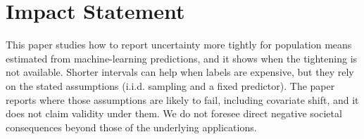 \documentclass{article}
\theoremstyle{plain}
\theoremstyle{remark}
\begin{document}












\section*{Impact Statement}
This paper studies how to report uncertainty more tightly for population means estimated from machine-learning predictions, and it shows when the tightening is not available. Shorter intervals can help when labels are expensive, but they rely on the stated assumptions (i.i.d. sampling and a fixed predictor). The paper reports where those assumptions are likely to fail, including covariate shift, and it does not claim validity under them. We do not foresee direct negative societal consequences beyond those of the underlying applications.




\newpage
\appendix
\onecolumn


\end{document}
